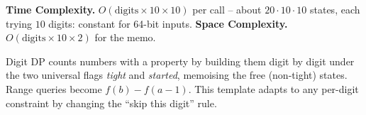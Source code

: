 \begin{complexitybox}
\textbf{Time Complexity.} $O(\text{digits}\times10\times10)$ per call --
about $20\cdot10\cdot10$ states, each trying $10$ digits: constant for
64-bit inputs. \textbf{Space Complexity.} $O(\text{digits}\times10\times
2)$ for the memo.
\end{complexitybox}

\begin{takeawaybox}
Digit DP counts numbers with a property by building them digit by digit
under the two universal flags \emph{tight} and \emph{started}, memoising
the free (non-tight) states. Range queries become $f(b)-f(a-1)$. This
template adapts to any per-digit constraint by changing the ``skip this
digit'' rule.
\end{takeawaybox}
